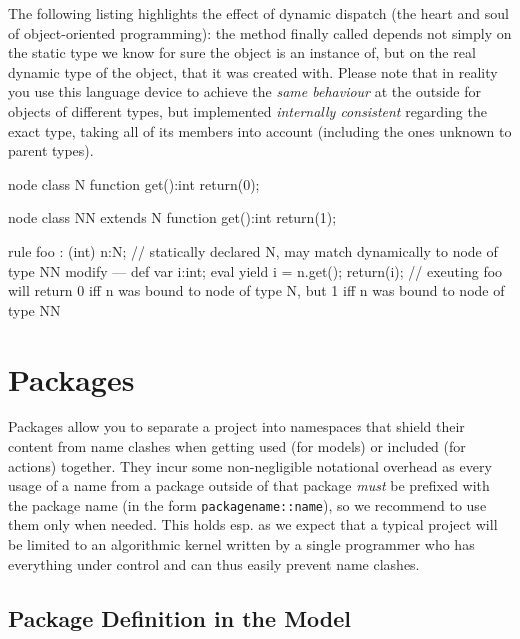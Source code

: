 \begin{example}
The following listing highlights the effect of dynamic dispatch (the heart and soul of object-oriented programming): 
the method finally called depends not simply on the static type we know for sure the object is an instance of,
but on the real dynamic type of the object, that it was created with.
Please note that in reality you use this language device to achieve the \emph{same behaviour} at the outside for objects of different types, but implemented \emph{internally consistent} regarding the exact type, taking all of its members into account (including the ones unknown to parent types).
	\begin{grgen}
node class N
{	
	function get():int
	{
		return(0);
	}
}

node class NN extends N
{	
	function get():int
	{
		return(1);
	}
}

rule foo : (int)
{
	n:N; // statically declared N, may match dynamically to node of type NN
	modify {
	---
		def var i:int;
		eval {
			yield i = n.get();
		}
		return(i); // exeuting foo will return 0 iff n was bound to node of type N, but 1 iff n was bound to node of type NN
	}
}
	\end{grgen}
\end{example}


\section{Packages}\label{sec:packages}

Packages allow you to separate a project into namespaces that shield their content from name clashes when getting used (for models) or included (for actions) together.
They incur some non-negligible notational overhead as every usage of a name from a package outside of that package \emph{must} be prefixed with the package name (in the form \verb#packagename::name#), so we recommend to use them only when needed.
This holds esp. as we expect that a typical project will be limited to an algorithmic kernel written by a single programmer who has everything under control and can thus easily prevent name clashes.

\subsection{Package Definition in the Model}\label{sub:packagemodel} 

